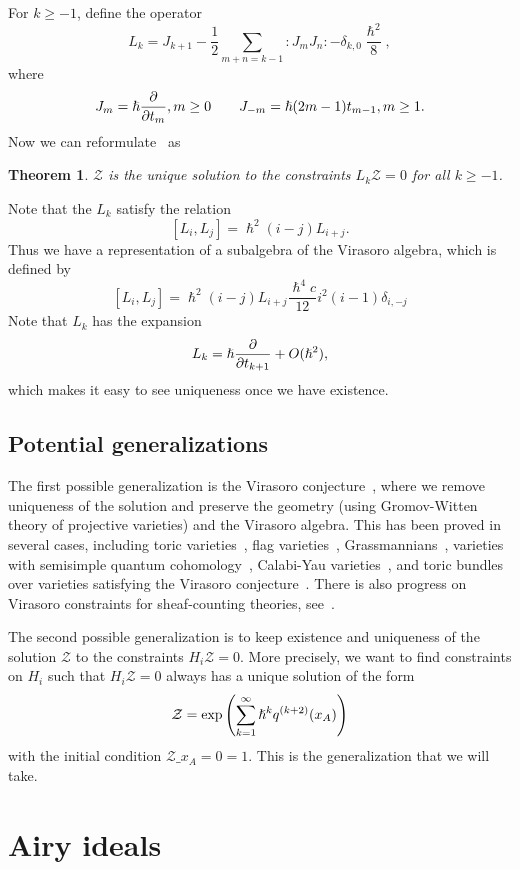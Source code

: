 \documentclass[leqno, openany]{memoir}
\theoremstyle{definition}
\theoremstyle{remark}
\theoremstyle{plain}
\newtheorem*{thm*}{Theorem}
\theoremstyle{definition}
\theoremstyle{remark}
\newcommand{\mc}[1]{\mathcal{#1}}
\begin{document}
For $k \geq -1$, define the operator
\[ L_k = J_{k+1} - \frac{1}{2} \sum_{m+n=k-1} :J_m J_n: - \delta_{k,0} \frac{\hslash^2}{8}, \]
where
\[ J_m = \hslash \pdv{t_m}, m \geq 0 \qquad J_{-m} = \hslash(2m-1)t_{m-1}, m \geq 1. \]
Now we can reformulate~ as
\begin{thm*}
    $\mc{Z}$ is the unique solution to the constraints $L_k \mc{Z} = 0$ for all $k \geq -1$.
\end{thm*}

Note that the $L_k$ satisfy the relation
\[ [L_i, L_j] = \hslash^2(i-j)L_{i+j}. \]
Thus we have a representation of a subalgebra of the Virasoro algebra, which is defined by
\[ [L_i, L_j] = \hslash^2(i-j)L_{i+j} \frac{\hslash^4 c}{12} i^2(i-1) \delta_{i, -j} \]
Note that $L_k$ has the expansion
\[ L_k = \hslash \pdv{t_{k+1}} + O(\hslash^2), \]
which makes it easy to see uniqueness once we have existence.

\subsection{Potential generalizations}

The first possible generalization is the Virasoro conjecture~\cite{virasoroconj}, where we remove uniqueness of the solution and preserve the geometry (using Gromov-Witten theory of projective varieties) and the Virasoro algebra. This has been proved in several cases, including toric varieties~\cites{virasorofanotoric}{virasorotoric}, flag varieties~\cite{virasoroflag}, Grassmannians~\cite{virasorograss}, varieties with semisimple quantum cohomology~\cite{2dsscohft}, Calabi-Yau varieties~\cite{virasorogw}, and toric bundles over varieties satisfying the Virasoro conjecture~\cite{virasorotoricbundle}. There is also progress on Virasoro constraints for sheaf-counting theories, see~\cite{virasoropt}.

The second possible generalization is to keep existence and uniqueness of the solution $\mc{Z}$ to the constraints $H_i \mc{Z} = 0$. More precisely, we want to find constraints on $H_i$ such that $H_i \mc{Z} = 0$ always has a unique solution of the form
\[ \mc{Z} = \exp \qty(\sum_{k=1}^{\infty} \hslash^k q^{(k+2)}(x_A)) \]
with the initial condition $\mc{Z} \_{x_A = 0} = 1$. This is the generalization that we will take.

\section{Airy ideals}
\end{document}
